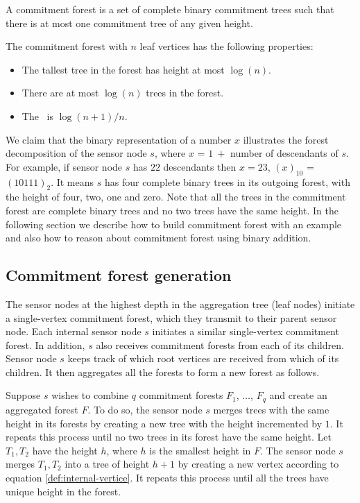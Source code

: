 		\begin{definition}\cite{chan2006secure}
			A commitment forest is a set of complete binary commitment trees such that there is	at most one commitment tree of any given height.
		\end{definition}
		The commitment forest with $n$ leaf vertices has the following properties:
		\begin{itemize}
			\item The tallest tree in the forest has height at most $\log(n)$.
			\item There are at most $\log(n)$ trees in the forest.
			\item The \inforate\ is $\log(n+1) / n$.
		\end{itemize}
		We claim that the binary representation of a number $x$ illustrates the forest decomposition of the sensor node $s$, where $x$ = $1\ +$ number of descendants of $s$.
		For example, if sensor node $s$ has $22$ descendants then $x =23$, $(x)_{10}$ = $(10111)_{2}$. 
		It means $s$ has four complete binary trees in its outgoing forest, with the height of four, two, one and zero.
		Note that all the trees in the commitment forest are complete binary trees and no two trees have the same height.
		In the following section we describe how to build commitment forest with an example and also how to reason about commitment forest using binary addition. 

	\subsection{Commitment forest generation}
		The sensor nodes at the highest depth in the aggregation tree (leaf nodes) initiate a single-vertex commitment forest, which they transmit to their parent sensor node.
		Each internal sensor node $s$ initiates a similar single-vertex commitment forest.
		In addition, $s$ also receives commitment 	forests from each of its children.
		Sensor node $s$ keeps track of which root vertices are received from which of its children.
		It then aggregates all the forests to form a new forest as follows.
		
		Suppose $s$ wishes to combine $q$ commitment forests $F_{1}$, $\dotsc$, $F_{q}$ and create an aggregated forest $F$.
		To do so, the sensor node $s$ merges trees with the same height in its forests by creating a new tree with the height incremented by $1$. 
		It repeats this process until no two trees in its forest have the same height. 
		Let $T_{1}, T_{2}$ have the height $h$, where $h$ is the smallest height in $F$.
		The sensor node $s$ merges $T_{1}, T_{2}$ into a tree of height $h + 1$ by creating a new vertex according to equation \ref{def:internal-vertice}.
		It repeats this process until all the trees have unique height in the forest.

